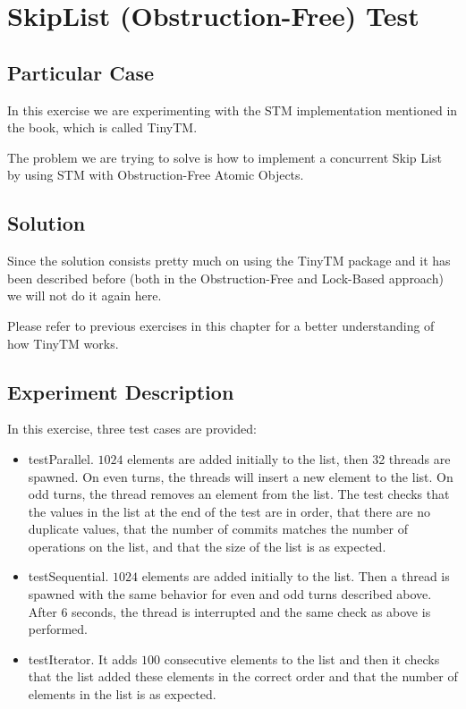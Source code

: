 \section{\textbf{SkipList (Obstruction-Free) Test}}
\subsection{Particular Case}
\par
In this exercise we are experimenting with the STM implementation mentioned in
the book, which is called TinyTM. 
\par
The problem we are trying to solve is how to implement a concurrent Skip List by
using STM with Obstruction-Free Atomic Objects.
\par
\subsection{Solution}
\par
Since the solution consists pretty much on using the TinyTM package and it has
been described before (both in the Obstruction-Free and Lock-Based approach) we
will not do it again here.
\par
Please refer to previous exercises in this chapter for a better understanding of
how TinyTM works.
\par
\subsection{Experiment Description}
\par
In this exercise, three test cases are provided:
\begin{itemize}
\item testParallel. $1024$ elements are added initially to the list, then 32
threads are spawned. On even turns, the threads will insert a new element to the
list. On odd turns, the thread removes an element from the list. The test checks
that the values in the list at the end of the test are in order, that there are
no duplicate values, that the number of commits matches the number of operations
on the list, and that the size of the list is as expected.
\item testSequential. $1024$ elements are added initially to the list. Then a
thread is spawned with the same behavior for even and odd turns described
above. After $6$ seconds, the thread is interrupted and the same check as above
is performed.
\item testIterator. It adds $100$ consecutive elements to the list and then it
checks that the list added these elements in the correct order and that the
number of elements in the list is as expected.
\end{itemize}
\par
